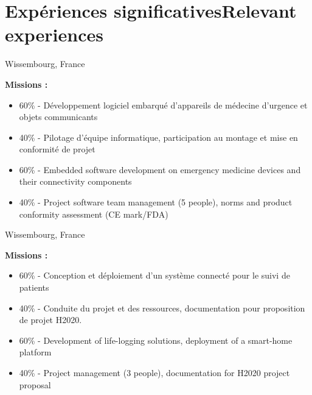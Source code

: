 \section{\ifnativelang Exp\'eriences significatives\else Relevant experiences\fi}

{}{}{Wissembourg, France}{
\textbf{Missions :} 
\begin{itemize}
\ifnativelang
\item 60\% - D\'eveloppement logiciel embarqu\'e d'appareils de médecine d'urgence et objets communicants
\item 40\% - Pilotage d'\'equipe informatique, participation au montage et mise en conformit\'e de projet
\else
\item 60\% - Embedded software development on emergency medicine devices and their connectivity components
\item 40\% - Project software team management (5 people),  norms and product conformity assessment (CE mark/FDA)
\fi
\end{itemize}
}

\vspace{\ItemsSpacing}

{}{}{Wissembourg, France}{
\textbf{Missions :} 
\begin{itemize}
\ifnativelang
\item 60\% - Conception et d\'eploiement d'un syst\`eme connect\'e pour le suivi de patients
\item 40\% - Conduite du projet et des ressources, documentation pour proposition de projet H2020.
\else
\item 60\% - Development of life-logging solutions, deployment of a smart-home platform
\item 40\% - Project management (3 people), documentation for H2020 project proposal
\fi
\end{itemize}
}


